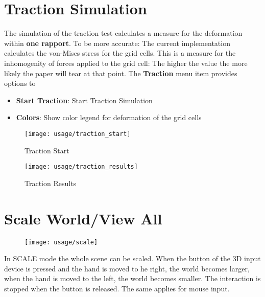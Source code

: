 \section{Traction Simulation}

The simulation of the traction test calculates a measure for the deformation within {\bf one rapport}.
To be more accurate: The current implementation calculates the von-Mises stress for the
grid cells. This is a measure for the inhomogenity of forces applied to the grid cell: The
higher the value the more likely the paper will tear at that point.
\newline
\newline
The {\bf Traction} menu item provides options to
\begin{itemize}
\item {\bf Start Traction}: Start Traction Simulation
\item {\bf Colors}: Show color legend for deformation of the grid cells
\end{itemize}

\begin{figure}[!Hhtp]
  \begin{center}
   \texttt{[image: usage/traction\_start]}
   \caption{Traction Start}
  \end{center}
\end{figure}

\begin{figure}[!Hhtp]
  \begin{center}
   \texttt{[image: usage/traction\_results]}
   \caption{Traction Results}
  \end{center}
\end{figure}
\clearpage



\section{Scale World/View All}

\begin{figure}[!Hhtp]
   \texttt{[image: usage/scale]}
\end{figure}

In SCALE mode the whole scene can be scaled. 
When the button of the 3D input device is pressed and the hand is
moved to he right, the world becomes larger, when the hand is moved
to the left, the world becomes smaller. The interaction is stopped when the
button is released.
The same applies for mouse input.
 		
